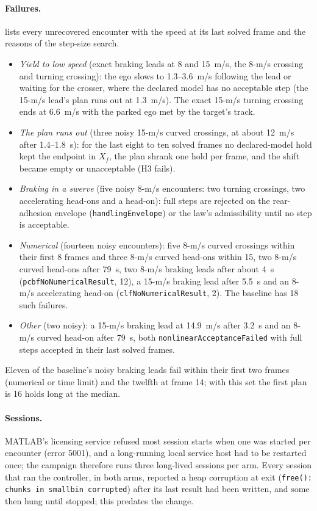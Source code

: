 \documentclass[11pt]{article}
\begin{document}
\paragraph{Failures.}
 lists every unrecovered encounter with the speed at its
last solved frame and the reasons of the step-size search.
\begin{itemize}
\item \emph{Yield to low speed} (exact braking leads at 8 and 15~m/s, the
8-m/s crossing and turning crossing): the ego slows to 1.3--3.6~m/s
following the lead or waiting for the crosser, where the declared model has
no acceptable step (the 15-m/s lead's plan runs out at 1.3~m/s). The exact
15-m/s turning crossing ends at 6.6~m/s with the parked ego met by the
target's track.
\item \emph{The plan runs out} (three noisy 15-m/s curved crossings, at about
12~m/s after 1.4--1.8~s): for the last eight to ten solved frames no
declared-model hold kept the endpoint in $X_f$, the plan shrank one hold per
frame, and the shift became empty or unacceptable (H3 fails).
\item \emph{Braking in a swerve} (five noisy 8-m/s encounters: two turning
crossings, two accelerating head-ons and a head-on): full steps are rejected
on the rear-adhesion envelope (\texttt{handlingEnvelope}) or the law's
admissibility until no step is acceptable.
\item \emph{Numerical} (fourteen noisy encounters): five 8-m/s curved
crossings within their first 8 frames and three 8-m/s curved head-ons within
15, two 8-m/s curved head-ons after 79~s, two 8-m/s braking leads after
about 4~s (\texttt{pcbfNoNumericalResult}, 12), a 15-m/s braking lead after
5.5~s and an 8-m/s accelerating head-on (\texttt{clfNoNumericalResult}, 2).
The baseline has 18 such failures.
\item \emph{Other} (two noisy): a 15-m/s braking lead at 14.9~m/s after
3.2~s and an 8-m/s curved head-on after 79~s, both
\texttt{nonlinearAcceptanceFailed} with full steps accepted in their last
solved frames.
\end{itemize}
Eleven of the baseline's noisy braking leads fail within their first two
frames (numerical or time limit) and the twelfth at frame 14; with this set the first plan is 16 holds long at the
median.

\paragraph{Sessions.}
MATLAB's licensing service refused most session starts when one was started
per encounter (error 5001), and a long-running local service host had to be
restarted once; the campaign therefore runs three long-lived sessions per
arm. Every session that ran the controller, in both arms, reported a heap
corruption at exit (\texttt{free(): chunks in smallbin corrupted}) after its
last result had been written, and some then hung until stopped; this
predates the change.
\end{document}
